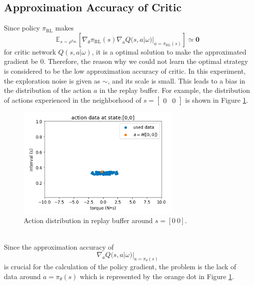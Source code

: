 \documentclass[english, dvipdfmx]{ampmt}             %
\newcommand{\expect}{\mathbb{E}}
\begin{document}
\subsection{Approximation Accuracy of Critic}
Since policy $\pi_{\textrm{RL}}$ makes
\begin{equation}
	\expect_{s\sim\rho^{\pi_{\textrm{RL}}}}[
	\nabla_{\theta}\pi_{\textrm{RL}}(s)\nabla_{a}Q(s,a|\omega)|_{a=\pi_{\textrm{RL}}(s)}] \simeq \bm{0}
\end{equation}
for critic network $Q(s,a|\omega)$, it is a optimal solution to make the approximated gradient be 0. Therefore, the reason why we could not learn the optimal strategy is considered to be the low approximation accuracy of critic. In this experiment, the exploration noise is given as $\sim$, and its scale is small. This leads to a bias in the distribution of the action $a$ in the replay buffer. For example, the distribution of actions experienced in the neighborhood of $s=\begin{bmatrix}0 & 0\end{bmatrix}$ is shown in Figure \ref{data_distribution}.
\begin{figure}[h]
	\centering
 	\includegraphics[width=8cm]{data_distribution.png}
 	\caption{Action distribution in replay buffer around $s=[0~0]$.} \label{data_distribution}
\end{figure}\\
Since the approximation accuracy of 
\begin{equation}
	\nabla_{a} Q(s,a|\omega)|_{a=\pi_{\theta}(s)}
\end{equation}
is crucial for the calculation of the policy gradient, the problem is the lack of data around $a=\pi_{\theta}(s)$ which is represented by the orange dot in Figure \ref{data_distribution}.
\end{document}
